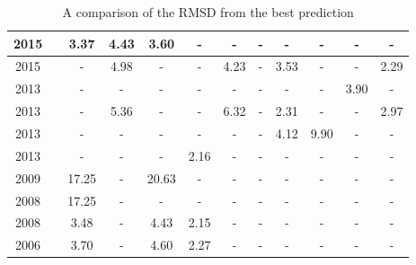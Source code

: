 \begin{sidewaystable}
\begin{tabular}{c|l|c|c|c|c|c|c|c|c|c|c}
    2015 & {\cite{shehu2015review}}          & 3.37  & 4.43  & 3.60  & -    & -     & -    & -    & -     & -     & -    \\ \hline
    2015 & {\cite{rocha2015multiobjective}}  & -     & 4.98  & -     & -    & 4.23  & -    & 3.53 & -     & -     & 2.29 \\ \hline
    2013 & {\cite{olson2013off}}             & -     & -     & -     & -    & -     & -    & -    & -     & 3.90  & -    \\ \hline
    2013 & {\cite{brasil2013multiobjective}} & -     & 5.36  & -     & -    & 6.32  & -    & 2.31 & -     & -     & 2.97 \\ \hline
    2013 & {\cite{dorn2013knowledge}}        & -     & -     & -     & -    & -     & -    & 4.12 & 9.90  & -     & -    \\ \hline
    2013 & {\cite{venske2013multiobjective}} & -     & -     & -     & 2.16 & -     & -    & -    & -     & -     & -    \\ \hline
    2009 & {\cite{mansour2009scatter}}       & 17.25 & -     & 20.63 & -    & -     & -    & -    & -     & -     & -    \\ \hline
    2008 & {\cite{kehyayan2008evolutionary}} & 17.25 & -     & -     & -    & -     & -    & -    & -     & -     & -    \\ \hline
    2008 & {\cite{judy2009multi}}            & 3.48  & -     & 4.43  & 2.15 & -     & -    & -    & -     & -     & -    \\ \hline
    2006 & {\cite{cutello2005multi}}         & 3.70  & -     & 4.60  & 2.27 & -     & -    & -    & -     & -     & -    \\ \hline
  \end{tabular}
  \caption{A comparison of the RMSD from the best prediction}
  \label{tab:literature-comparison}
\end{sidewaystable}
